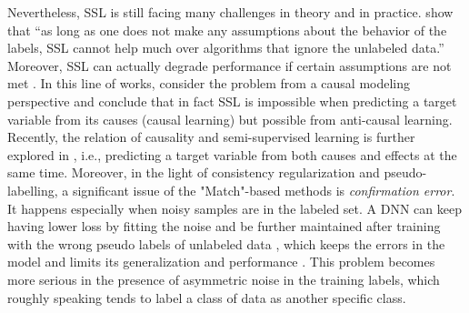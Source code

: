 Nevertheless, SSL is still facing many challenges in theory and in practice. \citet{ben2008does} show that “as long as one does not make any assumptions about the behavior of the
labels, SSL cannot help much over algorithms that ignore
the unlabeled data.” Moreover, SSL can actually degrade performance if certain assumptions are not met \citep{chapelle2010semi}. In this line of works, \citet{scholkopf2012causal} consider the problem from a causal modeling perspective and conclude that in fact SSL is impossible when predicting a target variable from its causes (causal learning) but possible from anti-causal learning. Recently, the relation of causality and semi-supervised learning is further explored in \citep{pmlr-v124-kugelgen20a}, i.e., predicting a target variable from both causes and effects at the same time. Moreover, in the light of consistency regularization and pseudo-labelling, a significant issue of the "Match"-based methods is \textit{confirmation error}. 
It happens especially when noisy samples are in the labeled set. A DNN can keep having lower loss by fitting the noise and be further maintained after training with the wrong pseudo labels of unlabeled data , which keeps the errors in the model and limits its generalization and performance \citep{tarvainenweight}. This problem becomes more serious in the presence of asymmetric noise in the training labels, which roughly speaking tends to label a class of data as another specific class. 

